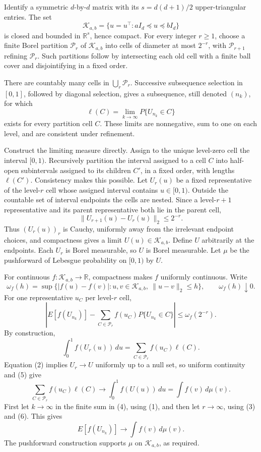 Identify a symmetric \(d\)-by-\(d\) matrix with its \(s=d(d+1)/2\) upper-triangular entries. The set
\[
 \mathcal K_{a,b}=\{u=u^\top:aI_d\preceq u\preceq bI_d\}
\]
is closed and bounded in \(\mathbb R^s\), hence compact. For every integer \(r\ge1\), choose a finite Borel partition \(\mathcal P_r\) of \(\mathcal K_{a,b}\) into cells of diameter at most \(2^{-r}\), with \(\mathcal P_{r+1}\) refining \(\mathcal P_r\). Such partitions follow by intersecting each old cell with a finite ball cover and disjointifying in a fixed order.

There are countably many cells in \(\bigcup_r\mathcal P_r\). Successive subsequence selection in \([0,1]\), followed by diagonal selection, gives a subsequence, still denoted \((n_k)\), for which
\[
 \ell(C)=\lim_{k\to\infty}P\{U_{n_k}\in C\}
\tag{1}
\]
exists for every partition cell \(C\). These limits are nonnegative, sum to one on each level, and are consistent under refinement.

Construct the limiting measure directly. Assign to the unique level-zero cell the interval \([0,1)\). Recursively partition the interval assigned to a cell \(C\) into half-open subintervals assigned to its children \(C'\), in a fixed order, with lengths \(\ell(C')\). Consistency makes this possible. Let \(U_r(u)\) be a fixed representative of the level-\(r\) cell whose assigned interval contains \(u\in[0,1)\). Outside the countable set of interval endpoints the cells are nested. Since a level-\(r+1\) representative and its parent representative both lie in the parent cell,
\[
 \|U_{r+1}(u)-U_r(u)\|_2\le2^{-r}.
\tag{2}
\]
Thus \((U_r(u))_r\) is Cauchy, uniformly away from the irrelevant endpoint choices, and compactness gives a limit \(U(u)\in\mathcal K_{a,b}\). Define \(U\) arbitrarily at the endpoints. Each \(U_r\) is Borel measurable, so \(U\) is Borel measurable. Let \(\mu\) be the pushforward of Lebesgue probability on \([0,1)\) by \(U\).

For continuous \(f:\mathcal K_{a,b}\to\mathbb R\), compactness makes \(f\) uniformly continuous. Write
\[
 \omega_f(h)=\sup\{|f(u)-f(v)|:u,v\in\mathcal K_{a,b},\
 \|u-v\|_2\le h\},\qquad \omega_f(h)\downarrow0.
\tag{3}
\]
For one representative \(u_C\) per level-\(r\) cell,
\[
 \left|E[f(U_{n_k})]-\sum_{C\in\mathcal P_r}
 f(u_C)P\{U_{n_k}\in C\}\right|\le\omega_f(2^{-r}).
\tag{4}
\]
By construction,
\[
 \int_0^1 f(U_r(u))\,du=\sum_{C\in\mathcal P_r}f(u_C)\ell(C).
\tag{5}
\]
Equation (2) implies \(U_r\to U\) uniformly up to a null set, so uniform continuity and (5) give
\[
 \sum_{C\in\mathcal P_r}f(u_C)\ell(C)
 \longrightarrow\int_0^1f(U(u))\,du=\int f(v)\,d\mu(v).
\tag{6}
\]
First let \(k\to\infty\) in the finite sum in (4), using (1), and then let \(r\to\infty\), using (3) and (6). This gives
\[
 E[f(U_{n_k})]\longrightarrow\int f(v)\,d\mu(v).
\]
The pushforward construction supports \(\mu\) on \(\mathcal K_{a,b}\), as required.
